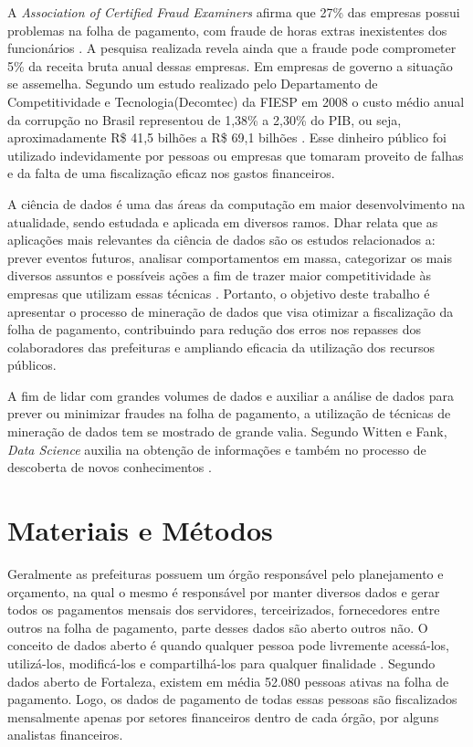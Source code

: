 \documentclass[12pt]{article}
\begin{document}
A \textit{Association of Certified Fraud Examiners} afirma que 27\% das empresas possui problemas na folha de pagamento, com fraude de horas extras inexistentes dos funcionários \cite{ACFE-2012}. A pesquisa realizada revela ainda que a fraude pode comprometer 5\% da receita bruta anual dessas empresas. Em empresas de governo a situação se assemelha. Segundo um estudo realizado pelo Departamento de Competitividade e Tecnologia(Decomtec) da FIESP em 2008 o custo médio anual da corrupção no Brasil representou de 1,38\% a 2,30\% do PIB, ou seja, aproximadamente R\$ 41,5 bilhões a R\$ 69,1 bilhões \cite{FIESP-2010}. Esse dinheiro público foi utilizado indevidamente por pessoas ou empresas que tomaram proveito de falhas e da falta de uma fiscalização eficaz nos gastos financeiros.

A ciência de dados é uma das áreas da computação em maior desenvolvimento na atualidade, sendo estudada e aplicada em diversos ramos. Dhar relata que as aplicações mais relevantes da ciência de dados são os estudos relacionados a: prever eventos futuros, analisar comportamentos em massa, categorizar os mais diversos assuntos e possíveis ações a fim de trazer maior competitividade às empresas que utilizam essas técnicas \cite{DHAR-VASANT2013}. Portanto, o objetivo deste trabalho é apresentar o processo de mineração de dados que visa otimizar a fiscalização da folha de pagamento, contribuindo para redução dos erros nos repasses  dos colaboradores das prefeituras e ampliando eficacia da utilização dos recursos públicos.

A fim de lidar com grandes volumes de dados e auxiliar a análise de dados para prever ou minimizar fraudes na folha de pagamento, a utilização de técnicas de mineração de dados tem se mostrado de grande valia. Segundo Witten e Fank, \textit{Data Science} auxilia na obtenção de informações e também no processo de descoberta de novos conhecimentos \cite{WITTEN-FRANK2011}.


\section{Materiais e Métodos} \label{sec:firstpage}
Geralmente as prefeituras possuem um órgão responsável pelo planejamento e orçamento, na qual o mesmo é responsável por manter diversos dados e gerar todos os pagamentos mensais dos servidores, terceirizados, fornecedores entre outros na folha de pagamento, parte desses dados são aberto outros não. O conceito de dados aberto é quando qualquer pessoa pode livremente acessá-los, utilizá-los, modificá-los e compartilhá-los para qualquer finalidade \cite{OPENKNOW-2017}. Segundo dados aberto de Fortaleza, existem em média 52.080 pessoas ativas na folha de pagamento. Logo, os dados de pagamento de todas essas pessoas são fiscalizados mensalmente apenas por setores financeiros dentro de cada órgão, por alguns analistas financeiros.
\end{document}

